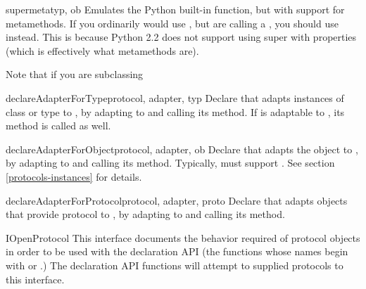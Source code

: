 \begin{verbatim%
}
\begin{verbatim%
}
\begin{verbatim%
}
\begin{verbatim%
}
\begin{funcdesc}{supermeta}{typ, ob}
Emulates the Python built-in  function, but with support for
metamethods.  If you ordinarily would use , but are calling a
, you should use  instead.  This is
because Python 2.2 does not support using super with properties (which is
effectively what metamethods are).

Note that if you are subclassing 
\end{funcdesc}


\begin{funcdesc}{declareAdapterForType}{protocol, adapter, typ }
Declare that  adapts instances of class or type 
to , by adapting  to  and
calling its  method.  If  is adaptable
to , its  method is
called as well.
\end{funcdesc}


\begin{funcdesc}{declareAdapterForObject}{protocol, adapter, ob }
Declare that  adapts the object  to , by
adapting  to  and calling its
 method.  Typically,  must support
.  See section \ref{protocols-instances} for details.
\end{funcdesc}


\begin{funcdesc}{declareAdapterForProtocol}{protocol, adapter, proto }
Declare that  adapts objects that provide protocol 
to , by adapting  to  and
calling its  method.
\end{funcdesc}
















\begin{classdesc*}{IOpenProtocol}
This interface documents the behavior required of protocol objects in order to
be used with the  declaration API (the functions whose names
begin with  or .)  The declaration API functions
will attempt to  supplied protocols to this interface.


\end{classdesc*}
\end{verbatim%
}
\end{verbatim%
}
\end{verbatim%
}
\end{verbatim%
}
